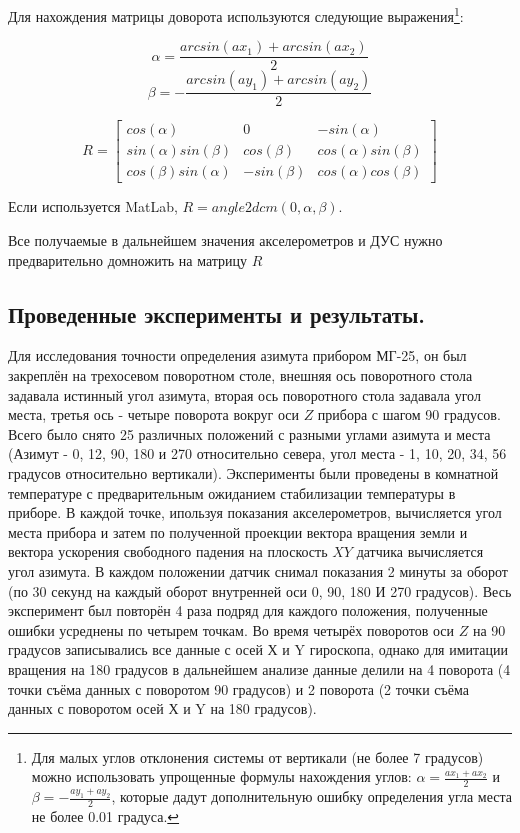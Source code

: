 \documentclass[a4paper,12pt]{article}
\begin{document}
Для нахождения матрицы доворота используются следующие выражения\footnote{Для малых углов отклонения системы от вертикали (не более 7 градусов) можно использовать упрощенные формулы нахождения углов: $\alpha = \frac{ax_1+ax_2}{2}$ и $\beta = - \frac{ay_1+ay_2}{2}$, которые дадут дополнительную ошибку определения угла места не более 0.01 градуса. }:

\[ \alpha = \frac{arcsin(ax_1)+arcsin(ax_2)}{2}\]
\[ \beta = - \frac{arcsin(ay_1)+arcsin(ay_2)}{2}\]

\[
R = 
\begin{bmatrix}
cos(\alpha) & 0 & -sin(\alpha)\\
sin(\alpha)sin(\beta) & cos(\beta) & cos(\alpha)sin(\beta) \\
cos(\beta)sin(\alpha) & -sin(\beta) & cos(\alpha)cos(\beta)
\end{bmatrix}
\]

Если используется MatLab, $R = angle2dcm(0, \alpha, \beta)$.

Все получаемые в дальнейшем значения акселерометров и ДУС нужно предварительно домножить на матрицу $R$

\subsection{Проведенные эксперименты и результаты.}

Для исследования точности определения азимута прибором МГ-25, он был закреплён на трехосевом поворотном столе, внешняя ось поворотного стола задавала истинный угол азимута, вторая ось поворотного стола задавала угол места, третья ось - четыре поворота вокруг оси $Z$ прибора с шагом 90 градусов. Всего было снято 25 различных положений с разными углами азимута и места (Азимут - 0, 12, 90, 180 и 270 относительно севера, угол места - 1, 10, 20, 34, 56 градусов относительно вертикали). Эксперименты были проведены в комнатной температуре с предварительным ожиданием стабилизации температуры в приборе. В каждой точке, ипользуя показания акселерометров, вычисляется угол места прибора и затем по полученной проекции вектора вращения земли и вектора ускорения свободного падения на плоскость $XY$ датчика вычисляется угол азимута. В каждом положении датчик снимал показания 2 минуты за оборот (по 30 секунд на каждый оборот внутренней оси 0, 90, 180 И 270 градусов). Весь эксперимент был повторён 4 раза подряд для каждого положения, полученные ошибки усреднены по четырем точкам.   Во время четырёх поворотов оси $Z$ на 90 градусов записывались все данные с осей Х и Y гироскопа, однако для имитации вращения на 180 градусов в дальнейшем анализе данные делили на 4 поворота (4 точки съёма данных с поворотом 90 градусов) и 2 поворота (2 точки съёма данных с поворотом осей Х и Y на 180 градусов).
\end{document}
